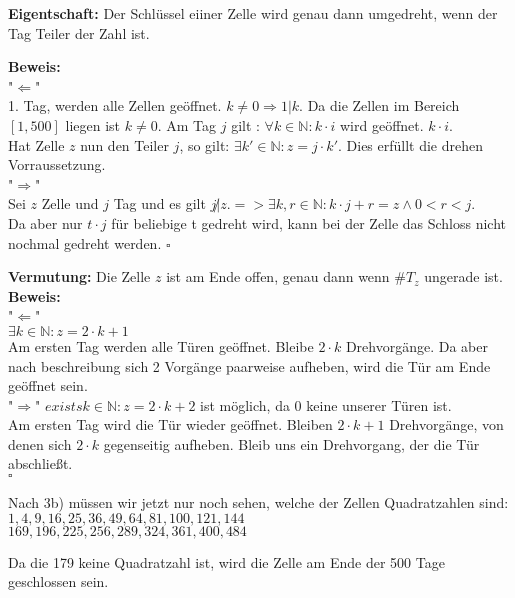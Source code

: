 \documentclass[11pt,a4paper,ngerman]{article}
\newcommand{\N}{\mathbb{N}}
\begin{document}
\vspace{30px}

\textbf{Eigentschaft:} Der Schlüssel eiiner Zelle wird genau dann umgedreht, wenn der Tag Teiler der Zahl ist.

\textbf{Beweis:} \\
"$\Leftarrow$"\\
1. Tag, werden alle Zellen geöffnet. $k\not= 0 \Rightarrow 1 | k $. Da die Zellen im Bereich $[1,500]$ liegen ist $k \not= 0$.
Am Tag $j$ gilt : $\forall k\in \N : k\cdot i$ wird geöffnet. $k \cdot i$.\\
Hat Zelle $z$ nun den Teiler $j$, so gilt: $\exists k' \in \N : z = j \cdot k'$. Dies erfüllt die drehen Vorraussetzung.\\
"$\Rightarrow$"\\
Sei $z$ Zelle und $j$ Tag und es gilt $j \not | z. => \exists k,r \in \N : k\cdot j + r = z \land 0<r<j$.\\
Da aber nur $t\cdot j$ für beliebige t gedreht wird, kann bei der Zelle das Schloss nicht nochmal gedreht werden.
\mbox{} \hfill $\square$


\vspace{10px}

\textbf{Vermutung:} Die Zelle $z$ ist am Ende offen, genau dann wenn $\#T_z$ ungerade ist.\\
\textbf{Beweis:}\\
"$\Leftarrow$"\\
$\exists k \in \N : z = 2 \cdot k + 1$\\
Am ersten Tag werden alle Türen geöffnet. Bleibe $2\cdot k$ Drehvorgänge. Da aber nach beschreibung sich 2 Vorgänge paarweise aufheben,
wird die Tür am Ende geöffnet sein.\\
"$\Rightarrow$"
$exists k \in \N : z = 2 \cdot k + 2$ ist möglich, da 0 keine unserer Türen ist.\\
Am ersten Tag wird die Tür wieder geöffnet. Bleiben $2\cdot k +1$ Drehvorgänge, von denen sich $2\cdot k$ gegenseitig aufheben. Bleib uns ein Drehvorgang, der die Tür abschließt.\\
\mbox{} \hfill $\square$

\vspace{15px}

Nach 3b) müssen wir jetzt nur noch sehen, welche der Zellen Quadratzahlen sind:
$1, 4, 9, 16, 25, 36, 49, 64, 81, 100, 121, 144$\\
$169, 196, 225, 256, 289, 324, 361, 400, 484$

\vspace{10px}

Da die 179 keine Quadratzahl ist, wird die Zelle am Ende der 500 Tage geschlossen sein.
\end{document}
